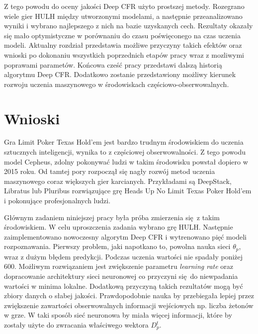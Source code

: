 \documentclass[12pt,oneside,a4paper]{report}
\begin{document}
 
Z tego powodu do oceny jakości Deep CFR użyto prostszej metody.
Rozegrano wiele gier HULH między utworzonymi modelami, a następnie przeanalizowano wyniki
i wybrano
najlepszego z nich na bazie uzyskanych cech. Rezultaty okazały się mało optymistyczne w porównaniu
do czasu poświęconego na czas uczenia modeli.
Aktualny rozdział przedstawia możliwe przyczyny takich efektów oraz wnioski po dokonaniu wszystkich poprzednich etapów
pracy wraz z
mozliwymi poprawami parametów. Końcowa cześć pracy przedstawi dalszą historią algorytmu Deep CFR.
Dodatkowo zostanie przedstawiony 
możliwy
kierunek rozwoju uczenia maszynowego w środowiskach częściowo-obserwowalnych.





\section{Wnioski}

Gra Limit Poker Texas Hold'em jest bardzo trudnym środowiskiem do uczenia sztucznych
inteligencji, wynika to z częściowej obserwowalności. 
Z tego powodu model Cepheus, zdolny pokonywać ludzi w takim środowisku powstał 
dopiero w 2015 roku. Od tamtej pory rozpoczął się nagły rozwój metod uczenia maszynowego 
coraz większych gier 
karcianych.
Przykładami są DeepStack, Libratus lub Pluribus rozwiązujące grę Heads Up No Limit Texas Poker Hold'em i pokonujące
profesjonalnych ludzi.

Głównym zadaniem niniejszej pracy była próba zmierzenia się z takim środowiskiem. W celu uproszczenia
zadania wybrano grę HULH. Następnie zaimplementowano 
nowoczesny algorytm Deep CFR i wytrenowano pięć modeli
rozpoznawania. Pierwszy problem, jaki napotkano to, powolna nauka sieci $\theta_{p}$,
wraz z dużym błędem predykcji. Podczas uczenia wartości nie spadały poniżej 600.
Możliwym rozwiązaniem jest zwiększenie parametru \emph{learning rate}  
 oraz
dopracowanie architektury sieci neuronowej co przyczyni się do niewpadania wartości w minima
lokalne. Dodatkową przyczyną takich rezultatów mogą być
zbiory danych o słabej jakości. Prawdopodobnie nauka by przebiegała lepiej przez zwiększenie
zawartości obserwowalnych informacji wejściowych np. liczba żetonów w grze. W taki sposób
sieć neuronowa by miała więcej informacji, które by zostały użyte do zwracania właściwego 
wektora $D_{p}^{t}$.
\end{document}
